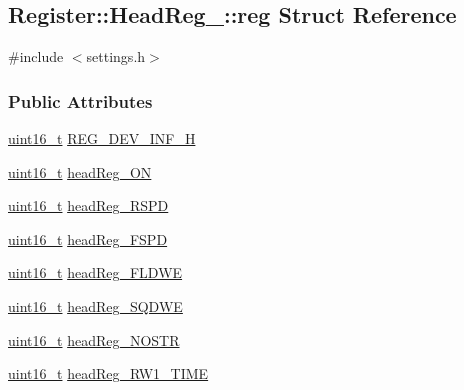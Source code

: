 \hypertarget{structRegister_1_1HeadReg___1_1reg}{}\subsection{Register\+:\+:Head\+Reg\+\_\+\+:\+:reg Struct Reference}
\label{structRegister_1_1HeadReg___1_1reg}


{\ttfamily \#include $<$settings.\+h$>$}

\subsubsection*{Public Attributes}
\begin{DoxyCompactItemize}
\item 
\mbox{\hyperlink{settings_8h_a017dd44e68049ffdd31500a8cd01ba68}{uint16\+\_\+t}} \mbox{\hyperlink{structRegister_1_1HeadReg___1_1reg_a3fded6f84a9ddf4d0153641cf7a20cd4}{R\+E\+G\+\_\+\+D\+E\+V\+\_\+\+I\+N\+F\+\_\+H}}
\item 
\mbox{\hyperlink{settings_8h_a017dd44e68049ffdd31500a8cd01ba68}{uint16\+\_\+t}} \mbox{\hyperlink{structRegister_1_1HeadReg___1_1reg_a6edf5f919d680bb61b5a84e41e67743b}{head\+Reg\+\_\+\+ON}}
\item 
\mbox{\hyperlink{settings_8h_a017dd44e68049ffdd31500a8cd01ba68}{uint16\+\_\+t}} \mbox{\hyperlink{structRegister_1_1HeadReg___1_1reg_a9b5d6e639070d8f85635e73fcfecfe20}{head\+Reg\+\_\+\+R\+S\+PD}}
\item 
\mbox{\hyperlink{settings_8h_a017dd44e68049ffdd31500a8cd01ba68}{uint16\+\_\+t}} \mbox{\hyperlink{structRegister_1_1HeadReg___1_1reg_acb8e0eeb71d035bffe3ecf2d26f7728f}{head\+Reg\+\_\+\+F\+S\+PD}}
\item 
\mbox{\hyperlink{settings_8h_a017dd44e68049ffdd31500a8cd01ba68}{uint16\+\_\+t}} \mbox{\hyperlink{structRegister_1_1HeadReg___1_1reg_af67f46f981fafafc6003f5f5b930b646}{head\+Reg\+\_\+\+F\+L\+D\+WE}}
\item 
\mbox{\hyperlink{settings_8h_a017dd44e68049ffdd31500a8cd01ba68}{uint16\+\_\+t}} \mbox{\hyperlink{structRegister_1_1HeadReg___1_1reg_a78a1d66988ec9d917d7ef823f0079f19}{head\+Reg\+\_\+\+S\+Q\+D\+WE}}
\item 
\mbox{\hyperlink{settings_8h_a017dd44e68049ffdd31500a8cd01ba68}{uint16\+\_\+t}} \mbox{\hyperlink{structRegister_1_1HeadReg___1_1reg_aa5432298a95b6196228615d5dc069dd7}{head\+Reg\+\_\+\+N\+O\+S\+TR}}
\item 
\mbox{\hyperlink{settings_8h_a017dd44e68049ffdd31500a8cd01ba68}{uint16\+\_\+t}} \mbox{\hyperlink{structRegister_1_1HeadReg___1_1reg_ac033fdf4a5c7e2b5b9863d8a1b0cb0a2}{head\+Reg\+\_\+\+R\+W1\+\_\+\+T\+I\+ME}}

\end{DoxyCompactItemize}
